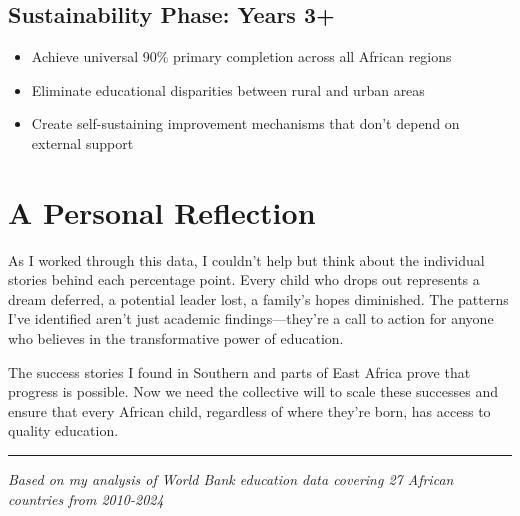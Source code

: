 \documentclass[12pt,a4paper]{article}
\begin{document}
\subsection{Sustainability Phase: Years 3+}
\begin{itemize}
    \item Achieve universal 90\% primary completion across all African regions
    \item Eliminate educational disparities between rural and urban areas
    \item Create self-sustaining improvement mechanisms that don't depend on external support
\end{itemize}

\section{A Personal Reflection}

As I worked through this data, I couldn't help but think about the individual stories behind each percentage point. Every child who drops out represents a dream deferred, a potential leader lost, a family's hopes diminished. The patterns I've identified aren't just academic findings---they're a call to action for anyone who believes in the transformative power of education.

The success stories I found in Southern and parts of East Africa prove that progress is possible. Now we need the collective will to scale these successes and ensure that every African child, regardless of where they're born, has access to quality education.

\vspace{1cm}
\hrule
\vspace{0.5cm}
\textit{Based on my analysis of World Bank education data covering 27 African countries from 2010-2024}
\end{document}
